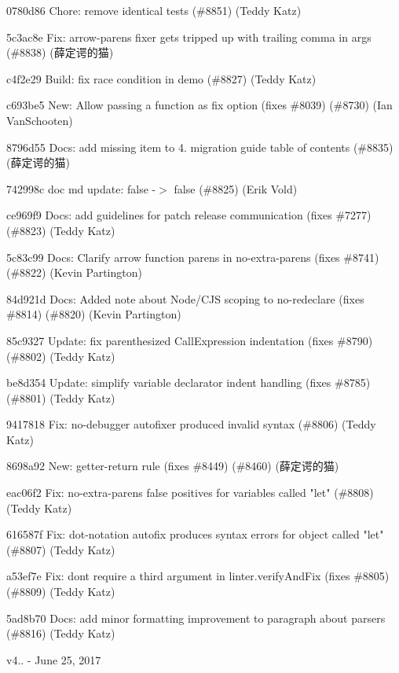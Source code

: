 \begin{DoxyItemize}
\item 0780d86 Chore\+: remove identical tests (\#8851) (Teddy Katz)
\item 5c3ac8e Fix\+: arrow-\/parens fixer gets tripped up with trailing comma in args (\#8838) (薛定谔的猫)
\item c4f2e29 Build\+: fix race condition in demo (\#8827) (Teddy Katz)
\item c693be5 New\+: Allow passing a function as {\ttfamily fix} option (fixes \#8039) (\#8730) (Ian Van\+Schooten)
\item 8796d55 Docs\+: add missing item to 4. migration guide table of contents (\#8835) (薛定谔的猫)
\item 742998c doc md update\+: false -\/\texorpdfstring{$>$}{>} {\ttfamily false} (\#8825) (Erik Vold)
\item ce969f9 Docs\+: add guidelines for patch release communication (fixes \#7277) (\#8823) (Teddy Katz)
\item 5c83c99 Docs\+: Clarify arrow function parens in no-\/extra-\/parens (fixes \#8741) (\#8822) (Kevin Partington)
\item 84d921d Docs\+: Added note about Node/\+CJS scoping to no-\/redeclare (fixes \#8814) (\#8820) (Kevin Partington)
\item 85c9327 Update\+: fix parenthesized Call\+Expression indentation (fixes \#8790) (\#8802) (Teddy Katz)
\item be8d354 Update\+: simplify variable declarator indent handling (fixes \#8785) (\#8801) (Teddy Katz)
\item 9417818 Fix\+: no-\/debugger autofixer produced invalid syntax (\#8806) (Teddy Katz)
\item 8698a92 New\+: getter-\/return rule (fixes \#8449) (\#8460) (薛定谔的猫)
\item eac06f2 Fix\+: no-\/extra-\/parens false positives for variables called "{}let"{} (\#8808) (Teddy Katz)
\item 616587f Fix\+: dot-\/notation autofix produces syntax errors for object called "{}let"{} (\#8807) (Teddy Katz)
\item a53ef7e Fix\+: don\textquotesingle{}t require a third argument in linter.\+verify\+And\+Fix (fixes \#8805) (\#8809) (Teddy Katz)
\item 5ad8b70 Docs\+: add minor formatting improvement to paragraph about parsers (\#8816) (Teddy Katz)
\end{DoxyItemize}

v4.. -\/ June 25, 2017



